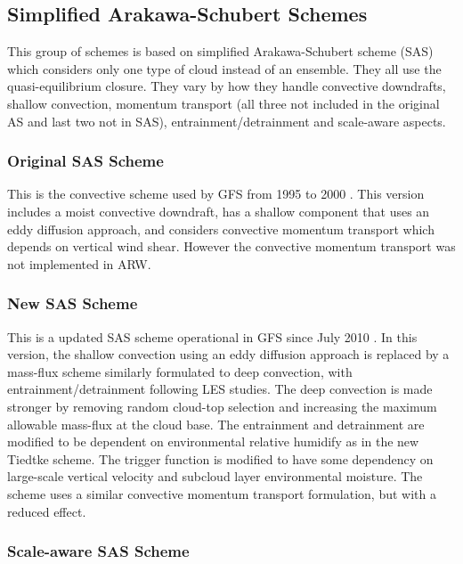 \subsection{Simplified Arakawa-Schubert Schemes}

This group of schemes is based on simplified Arakawa-Schubert scheme (SAS) \citep{grell93} 
which considers only one type of cloud instead of an ensemble. They all use the 
quasi-equilibrium closure. They vary by how they handle convective downdrafts, 
shallow convection, momentum transport (all three not included in the original 
AS and last two not in SAS), entrainment/detrainment and scale-aware aspects.

\subsubsection{Original SAS Scheme}

This is the convective scheme used by GFS from 1995 to 2000 \citep{pan95}. This version 
includes a moist convective downdraft, has a shallow component that uses an 
eddy diffusion approach, and considers convective momentum transport which 
depends on vertical wind shear. However the convective momentum transport 
was not implemented in ARW. 

\subsubsection{New SAS Scheme}

This is a updated SAS scheme operational in GFS since July 2010 \citep{han11}. In this version, 
the shallow convection using an eddy diffusion approach is replaced by a mass-flux 
scheme similarly formulated to deep convection, with entrainment/detrainment 
following LES studies. The deep convection is made stronger by removing random 
cloud-top selection and increasing the maximum allowable mass-flux at the cloud base. 
The entrainment and detrainment are modified to be dependent on environmental relative 
humidify as in the new Tiedtke scheme. The trigger function is modified to have some 
dependency on large-scale vertical velocity and subcloud layer environmental moisture. 
The scheme uses a similar convective momentum transport formulation, but with a reduced effect.

\subsubsection{Scale-aware SAS Scheme}

